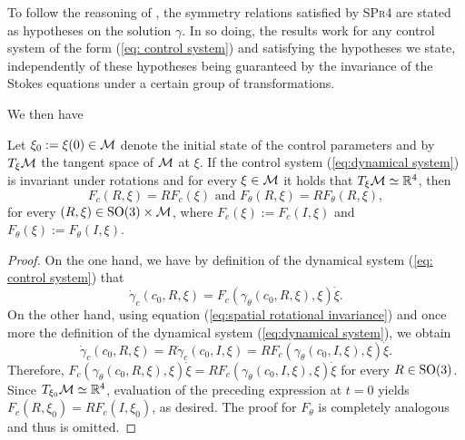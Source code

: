 \begin{remark}
To follow the reasoning of \cite{Alouges2017}, the symmetry relations satisfied by \textsc{SPr4} are stated as hypotheses on the solution $\gamma$. In so doing, the results work for any control system of the form (\ref{eq: control system}) and satisfying the hypotheses we state, independently of these hypotheses being guaranteed by the invariance of the Stokes equations under a certain group of transformations. 
\end{remark}
We then have
\begin{proposition}
\label{prop: rotational invariance}
Let $\xi_0 := \xi(0) \in \mathcal{M}$ denote the initial state of the control parameters and by $T_{\xi}\mathcal{M}$ the tangent space of $\mathcal{M}$ at $\xi$. If the control system (\ref{eq:dynamical system}) is invariant under rotations and for every $\xi \in \mathcal{M}$ it holds that $T_{\xi} \mathcal{M} \simeq \mathbb{R}^4$, then
\begin{equation}
	F_c(R, \xi) = R F_c(\xi) \text { and } F_\theta(R, \xi) = R F_{\theta} (R, \xi),
\end{equation}
for every $(R, \xi) \in \operatorname{SO}(3) \times \mathcal{M}$, where $F_c(\xi) := F_{c}(I, \xi)$ and $F_{\theta}(\xi) := F_{\theta}(I, \xi)$. 
\end{proposition}

\begin{proof}
On the one hand, we have by definition of the dynamical system (\ref{eq: control system}) that
\begin{equation}
	\dot{\gamma}_c(c_0, R, \xi) = F_c(\gamma_{\theta}(c_0, R, \xi), \xi) \dot{\xi}.
\end{equation}
On the other hand, using equation (\ref{eq:spatial rotational invariance}) and once more the definition of the dynamical system (\ref{eq:dynamical system}), we obtain
\begin{equation}
	\dot{\gamma}_c (c_0, R, \xi) = R  \dot{\gamma}_c(c_0, I, \xi) = 
	R F_c(\gamma_{\theta}(c_0, I, \xi), \xi) \dot{\xi}.
\end{equation}
Therefore, $F_c(\gamma_{\theta}(c_0, R, \xi), \xi) \dot{\xi} = R F_{c}(\gamma_{\theta}(c_0, I, \xi), \xi) \dot{\xi}$ for every $R \in \operatorname{SO}(3)$. Since $T_{\xi_0} \mathcal{M} \simeq \mathbb{R}^4$, evaluation of the preceding expression at $t = 0$ yields $F_{c}(R, \xi_0) = R F_{c}(I, \xi_0)$, as desired. The proof for $F_{\theta}$ is completely analogous and thus is omitted.
\end{proof}

